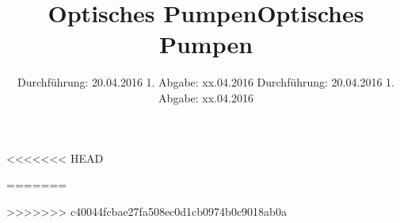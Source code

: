 <<<<<<< HEAD



\subject{Versuch 21}
\title{Optisches Pumpen}
\date{
  Durchführung: 20.04.2016
  \hspace{3em}
  1. Abgabe: xx.04.2016
}




\maketitle
\thispagestyle{empty}
\tableofcontents
\newpage





%
%
%
%


\printbibliography


=======



\subject{Versuch 21}
\title{Optisches Pumpen}
\date{
  Durchführung: 20.04.2016
  \hspace{3em}
  1. Abgabe: xx.04.2016
}




\maketitle
\thispagestyle{empty}
\tableofcontents
\newpage





%
%
%
%


\printbibliography


>>>>>>> c40044fcbae27fa508ec0d1cb0974b0c9018ab0a
